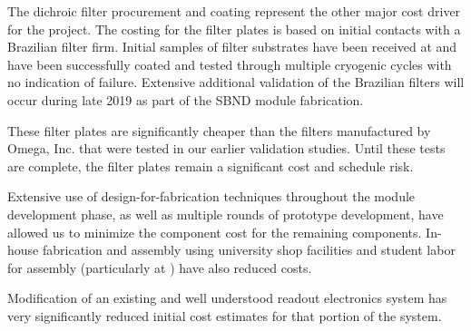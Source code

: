 The dichroic filter procurement and coating represent the other major cost driver for the project.  The costing for the filter plates is based on initial contacts with a Brazilian filter firm.  Initial samples of filter substrates have been received at  and have been successfully coated and tested through multiple cryogenic cycles with no indication of failure. Extensive additional validation of the Brazilian filters  will occur during late 2019 as part of the SBND module fabrication.

These filter plates are significantly cheaper than the filters manufactured by Omega, Inc. that were tested in our earlier validation studies.  Until these tests are complete, the filter plates remain a significant cost and schedule risk.

Extensive use of design-for-fabrication techniques throughout the module development phase, as well as multiple rounds of prototype development, have allowed us to minimize the component cost for the remaining components.  In-house fabrication and assembly using university shop facilities and student labor for assembly (particularly at ) have also reduced costs.

Modification of an existing and well understood readout electronics system has very significantly reduced initial cost estimates for that portion of the system.
